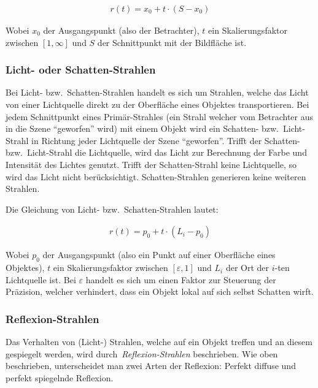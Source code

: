 \begin{gather}
    r(t) = x_{0} + t \cdot (S - x_{0})
\end{gather}

Wobei $x_{0}$ der Ausgangspunkt (also der Betrachter), $t$ ein
Skalierungsfaktor zwischen $[1, \infty]$ und $S$ der Schnittpunkt mit der
Bildfläche ist.

\subsubsection{Licht- oder Schatten-Strahlen}
\label{ssubsec:ray_tracing:shadow_rays}

Bei Licht- bzw.\ Schatten-Strahlen handelt es sich um Strahlen, welche
das Licht von einer Lichtquelle direkt zu der Oberfläche eines Objektes
transportieren. Bei jedem Schnittpunkt eines Primär-Strahles (ein Strahl
welcher vom Betrachter aus in die Szene ``geworfen'' wird) mit einem
Objekt wird ein Schatten- bzw.\ Licht-Strahl in Richtung jeder
Lichtquelle der Szene ``geworfen''. Trifft der Schatten- bzw.\
Licht-Strahl die Lichtquelle, wird das Licht zur Berechnung der Farbe
und Intensität des Lichtes genutzt. Trifft der Schatten-Strahl keine
Lichtquelle, so wird das Licht nicht berücksichtigt. Schatten-Strahlen
generieren keine weiteren Strahlen.

Die Gleichung von Licht- bzw.\ Schatten-Strahlen lautet:

\begin{gather}
    r(t) = p_{0} + t \cdot (L_{i} - p_{0})
\end{gather}

Wobei $p_{0}$ der Ausgangspunkt (also ein Punkt auf einer Oberfläche
eines Objektes), $t$ ein Skalierungsfaktor zwischen $[\varepsilon, 1]$ und
$L_{i}$ der Ort der $i$-ten Lichtquelle ist. Bei $\varepsilon$ handelt es
sich um einen Faktor zur Steuerung der Präzision, welcher verhindert,
dass ein Objekt lokal auf sich selbst Schatten wirft.

\subsubsection{Reflexion-Strahlen}
\label{ssubsec:ray_tracing:reflection_rays}

Das Verhalten von (Licht-) Strahlen, welche auf ein Objekt treffen und
an diesem gespiegelt werden, wird durch~\textit{Reflexion-Strahlen}
beschrieben. Wie oben beschrieben, unterscheidet man zwei Arten der
Reflexion: Perfekt diffuse und perfekt spiegelnde Reflexion.

